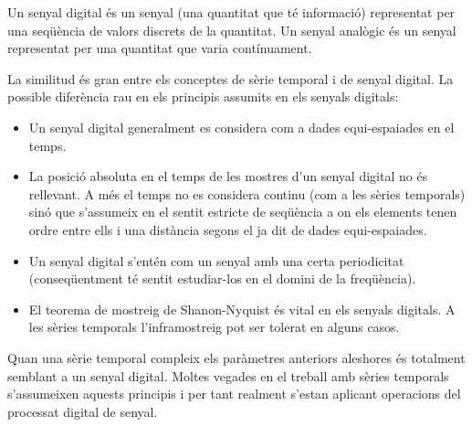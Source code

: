 Un senyal digital és un senyal (una quantitat que té informació) representat per una seqüència de valors discrets de la quantitat. Un senyal analògic és un senyal representat per una quantitat que varia contínuament.

La similitud és gran entre els conceptes de sèrie temporal i de senyal digital. La possible diferència rau en els principis assumits en els senyals digitals:
\begin{itemize}
\item Un senyal digital generalment es considera com a dades equi-espaiades en el temps.
\item La posició absoluta en el temps de les mostres d'un senyal digital no és rellevant. A més el temps no es considera continu (com a les sèries temporals) sinó que s'assumeix en el sentit estricte de seqüència a on els elements tenen ordre entre ells i una distància segons el ja dit de dades equi-espaiades.
\item Un senyal digital s'entén com un senyal amb una certa periodicitat (conseqüentment té sentit estudiar-los en el domini de la freqüència).
\item El teorema de mostreig de Shanon-Nyquist és vital en els senyals digitals. A les sèries temporals l'inframostreig pot ser tolerat en alguns casos.
\end{itemize}

Quan una sèrie temporal compleix els paràmetres anteriors aleshores és totalment semblant a un senyal digital. Moltes vegades en el treball amb sèries temporals s'assumeixen aquests principis i per tant realment s'estan aplicant operacions del processat digital de senyal.




